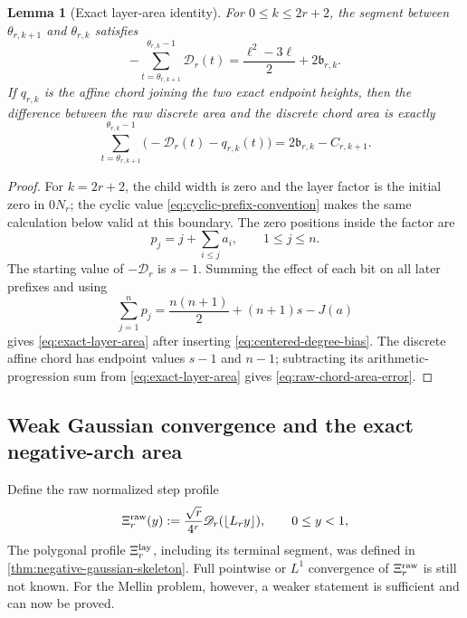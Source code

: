\documentclass[11pt]{article}
\newtheorem{lemma}[theorem]{Lemma}
\theoremstyle{definition}
\theoremstyle{remark}
\begin{document}
\begin{lemma}[Exact layer-area identity]
\label{lem:exact-layer-area}
For \(0\le k\le2r+2\), the segment between \(\theta_{r,k+1}\) and
\(\theta_{r,k}\) satisfies
\begin{equation}
 {
 -\sum_{t=\theta_{r,k+1}}^{\theta_{r,k}-1}\mathscr D_r(t)
 =\frac{\ell^2-3\ell}{2}+2\mathfrak b_{r,k}.
 }
 \label{eq:exact-layer-area}
\end{equation}
If \(q_{r,k}\) is the affine chord joining the two exact endpoint heights,
then the difference between the raw discrete area and the discrete chord
area is exactly
\begin{equation}
 {
 \sum_{t=\theta_{r,k+1}}^{\theta_{r,k}-1}
 \bigl(-\mathscr D_r(t)-q_{r,k}(t)\bigr)
 =2\mathfrak b_{r,k}-C_{r,k+1}.
 }
 \label{eq:raw-chord-area-error}
\end{equation}
\end{lemma}

\begin{proof}
For \(k=2r+2\), the child width is zero and the layer factor is the initial
zero in \(0N_r\); the cyclic value \eqref{eq:cyclic-prefix-convention} makes
the same calculation below valid at this boundary.
The zero positions inside the factor are
\[
 p_j=j+\sum_{i\le j}a_i,
 \qquad 1\le j\le n.
\]
The starting value of \(-\mathscr D_r\) is \(s-1\).  Summing the effect of
each bit on all later prefixes and using
\[
 \sum_{j=1}^np_j
 =\frac{n(n+1)}2+(n+1)s-J(a)
\]
gives \eqref{eq:exact-layer-area} after inserting
\eqref{eq:centered-degree-bias}.  The discrete affine chord has endpoint
values \(s-1\) and \(n-1\); subtracting its arithmetic-progression sum from
\eqref{eq:exact-layer-area} gives \eqref{eq:raw-chord-area-error}.
\end{proof}

\subsection{Weak Gaussian convergence and the exact negative-arch area}

Define the raw normalized step profile
\begin{equation}
 \Xi_r^{\rm raw}(y)
 :=\frac{\sqrt r}{4^r}
 \mathscr D_r(\lfloor L_r y\rfloor),
 \qquad 0\le y<1,
 \label{eq:raw-profile-normalized}
\end{equation}
The polygonal profile \(\Xi_r^{\rm lay}\), including its terminal segment,
was defined in \cref{thm:negative-gaussian-skeleton}.  Full pointwise or
\(L^1\) convergence of
\(\Xi_r^{\rm raw}\) is still not known.  For the Mellin problem, however,
a weaker statement is sufficient and can now be proved.
\end{document}
